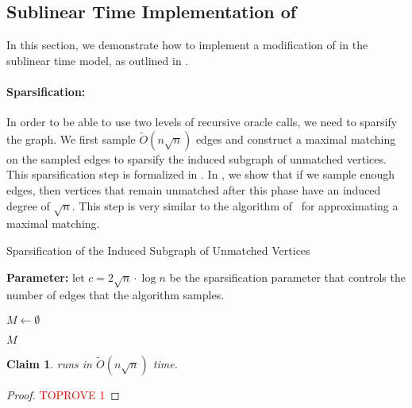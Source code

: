 \documentclass[letterpaper,11pt]{article}
\newtheorem{claim}[lemma]{Claim}
\begin{document}
\subsection{Sublinear Time Implementation of }

In this section, we demonstrate how to implement a modification of  in the sublinear time model,  as outlined in .




\paragraph{Sparsification:} In order to be able to use two levels of recursive oracle calls, we need to sparsify the graph. We first sample $\widetilde{O}(n \sqrt{n})$ edges and construct a maximal matching on the sampled edges to sparsify the induced subgraph of unmatched vertices. This sparsification step is formalized in . In , we show that if we sample enough edges, then vertices that remain unmatched after this phase have an induced degree of $\sqrt{n}$. This step is very similar to the algorithm of~\cite[Appendix A]{chen2020sublinear} for approximating a maximal matching.






\begin{algorithm}
\caption{Sparsification of the Induced Subgraph of Unmatched Vertices}
\label{alg:sparsification}
\textbf{Parameter:} let $c = 2 \sqrt{n} \cdot \log n$ be the sparsification parameter that controls the number of edges that the algorithm samples.

$M \gets \emptyset$


\Return $M$


\end{algorithm}


\begin{claim}\label{clm:sparsification-time}
     runs in $\widetilde{O}(n \sqrt{n})$ time.
\end{claim}
\begin{proof}\textcolor{red}{TOPROVE 1}\end{proof}
\end{document}
